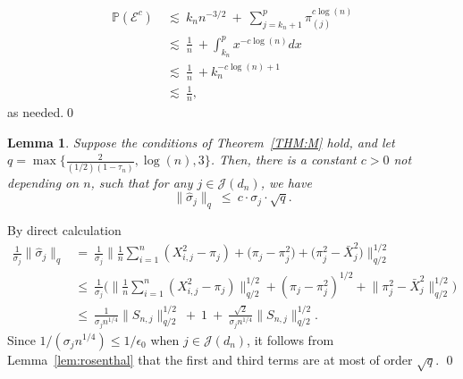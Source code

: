 \documentclass[aos,preprint]{imsart}
\numberwithin{equation}{section}
\theoremstyle{plain}
\newtheorem{lemma}{Lemma}[section]
\renewcommand{\hat}[1]{\widehat{#1}}
\newcommand{\J}{\mathcal{J}}
\renewcommand{\P}{\mathbb{P}}
\newcommand{\e}{\epsilon}
\newcommand{\ts}{\textstyle}
\newcommand{\1}{{\bf{1}}}
\newcommand{\0}{\mathbf{0}}
\begin{document}
\begin{equation}
\begin{split}
\P(\mathcal{E}^c) 
%
& \ \lesssim \ k_n n^{-3/2} \ + \ \sum_{j=k_n+1}^p \pi_{(j)}^{c\log(n)}\\[0.3cm]
%
& \ \lesssim \ \ts\frac{1}{n} \ +  \displaystyle\int_{k_n}^p x^{-c\log(n)}dx\\[0.3cm]
%
& \ \lesssim \ \ts\frac{1}{n} \ + k_n^{-c\log(n)+1}\\[0.3cm]
%
& \ \lesssim \ \ts\frac{1}{n},
\end{split}
\end{equation}
as needed.\qed




















\begin{lemma}\label{lem:sighatrnormM}
Suppose the conditions of Theorem~\ref{THM:M} hold, and let 
$q=\max\{\ts\frac{2}{(1/2)(1-\tau_n)}, \log(n),3\}$.
%
Then, there is a constant $c>0$ not depending on $n$, such that for any $j\in\mathcal{J}(d_n)$, we have
\begin{equation}
\|\hat\sigma_{j}\|_q \ \leq \  c \cdot \sigma_j \cdot \sqrt{q}.
\end{equation}
\end{lemma}
\proof By direct calculation
\begin{equation*}
\begin{split}
\ts\frac{1}{\sigma_j}\|\hat\sigma_{j}\|_q
%
&= \ \ts\frac{1}{\sigma_j} \Bigg\|\ts\frac 1n \sum_{i=1}^n (X_{i,j}^2-\pi_j)+\big(\pi_j-\pi_j^2\big)+\big(\pi_j^2-\bar{X}_j^2\big)\Bigg\|_{q/2}^{1/2}\\[0.2cm]
%
&\leq \ \ts\frac{1}{\sigma_j} \Bigg(\big\|\ts\frac 1n \sum_{i=1}^n (X_{i,j}^2-\pi_j)\big\|_{q/2}^{1/2}+(\pi_j-\pi_j^2)^{1/2}+\big\|\pi_j^2-\bar{X}_j^2\big\|_{q/2}^{1/2}\Bigg)\\[0.3cm]
%
&\leq \ \ts\frac{1}{\sigma_jn^{1/4}}\big\| S_{n,j}\big\|_{q/2}^{1/2} \ + \ 1 \ + \ \ts\frac{\sqrt{2}}{\sigma_jn^{1/4}}\big\| S_{n,j}\big\|_{q/2}^{1/2}.
%
\end{split}
\end{equation*}
Since $1/(\sigma_j n^{1/4})\leq 1/\e_0$ when $j\in\J(d_n)$, it follows from Lemma~\ref{lem:rosenthal} that the first and third terms are at most of order $\sqrt{q}$. \qed
\end{document}
